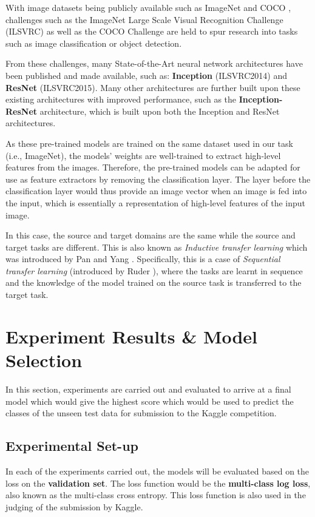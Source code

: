 \documentclass[sigconf,nonacm=true]{acmart}
\begin{document}
With image datasets being publicly available such as ImageNet and COCO \cite{lin2015microsoft}, challenges 
such as the ImageNet Large Scale Visual Recognition Challenge (ILSVRC) as well as the COCO Challenge are 
held to spur research into tasks such as image classification or object detection. 

From these challenges, many State-of-the-Art neural network architectures have been published and made available,
such as: \textbf{Inception} \cite{43022} (ILSVRC2014) and \textbf{ResNet} \cite{he2015deep} (ILSVRC2015). Many other 
architectures are further built upon these existing architectures with improved performance, such as the 
\textbf{Inception-ResNet} \cite{szegedy2016inceptionv4} architecture, which is built upon both the Inception and ResNet
architectures.

As these pre-trained models are trained on the same dataset used in our task (i.e., ImageNet), the models' weights
are well-trained to extract high-level features from the images. Therefore, the pre-trained models can be adapted 
for use as feature extractors by removing the classification layer. The layer before the classification layer would 
thus provide an image vector when an image is fed into the input, which is essentially a representation of high-level 
features of the input image.

In this case, the source and target domains are the same while the source and target tasks are different. 
This is also known as \textit{Inductive transfer learning} which was introduced by Pan and Yang \cite{10.1109/TKDE.2009.191}.
Specifically, this is a case of \textit{Sequential transfer learning} (introduced by Ruder \cite{Ruder2019Neural}), where 
the tasks are learnt in sequence and the knowledge of the model trained on the source task is transferred to the target task.

\section{Experiment Results \& Model Selection}
In this section, experiments are carried out and evaluated to arrive at a final model which would give the highest score
which would be used to predict the classes of the unseen test data for submission to the Kaggle competition.

\subsection{Experimental Set-up}
\label{section:setup}
In each of the experiments carried out, the models will be evaluated based on the loss on the \textbf{validation set}.
The loss function would be the \textbf{multi-class log loss}, also known as the multi-class cross entropy. This loss function is also 
used in the judging of the submission by Kaggle. 
\end{document}
